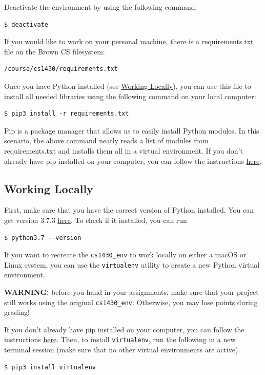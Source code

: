 \documentclass{article}
\begin{document}
Deactivate the environment by using the following command.
\begin{verbatim}
$ deactivate
\end{verbatim}

If you would like to work on your personal machine, there is a requirements.txt file on the Brown CS filesystem:
\begin{verbatim}
/course/cs1430/requirements.txt
\end{verbatim}
Once you have Python installed (see \hyperref[sec:local]{Working Locally}), you can use this file to install all needed libraries using the following command on your local computer:
\begin{verbatim}
$ pip3 install -r requirements.txt
\end{verbatim}

Pip is a package manager that allows us to easily install Python modules. In this scenario, the above command neatly reads a list of modules from requirements.txt and installs them all in a virtual environment. If you don't already have pip installed on your computer, you can follow the instructions \href{https://pip.pypa.io/en/stable/installing/}{here}.

\subsection{Working Locally}
\label{sec:local}
First, make sure that you have the correct version of Python installed. You can get version 3.7.3 \href{https://www.python.org/downloads/release/python-373/}{here}. To check if it installed, you can run
\begin{verbatim}
$ python3.7 --version
\end{verbatim}

If you want to recreate the \texttt{cs1430\_env} to work locally on either a macOS or Linux system, you can use the \texttt{virtualenv} utility to create a new Python virtual environment.

\textbf{WARNING:} before you hand in your assignments, make sure that your project still works using the original \texttt{cs1430\_env}. Otherwise, you may lose points during grading!

If you don't already have pip installed on your computer, you can follow the instructions \href{https://pip.pypa.io/en/stable/installing/}{here}. Then, to install \texttt{virtualenv}, run the following in a new terminal session (make sure that no other virtual environments are active).
\begin{verbatim}
$ pip3 install virtualenv
\end{verbatim}
\end{document}
